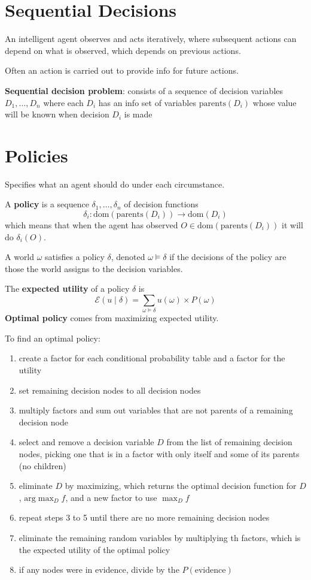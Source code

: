 \documentclass[11pt]{article}
\begin{document}
\section{Sequential Decisions}
\label{sec:org5021458}
An intelligent agent observes and acts iteratively, where subsequent
actions can depend on what is observed, which depends on previous actions.

Often an action is carried out to provide info for future actions.

\textbf{Sequential decision problem}: consists of a sequence of decision variables
\(D_{1}, \dots, D_{n}\) where each \(D_{i}\) has an info set of variables
\(\text{parents}(D_{i})\) whose value will be known when decision \(D_{i}\)
is made
\section{Policies}
\label{sec:org7a87369}
Specifies what an agent should do under each circumstance.

A \textbf{policy} is a sequence \(\delta_{1}, \dots, \delta_{n}\) of decision functions
$$ \delta_{i} : \text{dom}(\text{parents}(D_{i})) \to \text{dom}(D_{i}) $$
which means that when the agent has observed \(O \in \text{dom}(\text{parents}(D_{i}))\)
it will do \(\delta_{i}(O)\).

A world \(\omega\) satisfies a policy \(\delta\), denoted \(\omega \models \delta\) if the
decisions of the policy are those the world assigns to the decision variables.

The \textbf{expected utility} of a policy \(\delta\) is
$$ \mathcal{E} ( u \mid \delta ) = \sum_{\omega \models \delta} u(\omega) \times P(\omega) $$
\textbf{Optimal policy} comes from maximizing expected utility.

To find an optimal policy:
\begin{enumerate}
\item create a factor for each conditional probability table and a factor for the utility
\item set remaining decision nodes to all decision nodes
\item multiply factors and sum out variables that are not parents of a remaining decision node
\item select and remove a decision variable \(D\) from the list of remaining decision nodes,
picking one that is in a factor with only itself and some of its parents (no children)
\item eliminate \(D\) by maximizing, which returns the optimal decision function for \(D\),
\(\text{arg} \max_{D} f\), and a new factor to use \(\max_{D} f\)
\item repeat steps 3 to 5 until there are no more remaining decision nodes
\item eliminate the remaining random variables by multiplying th factors, which is the
expected utility of the optimal policy
\item if any nodes were in evidence, divide by the \(P(\text{evidence})\)
\end{enumerate}
\end{document}
